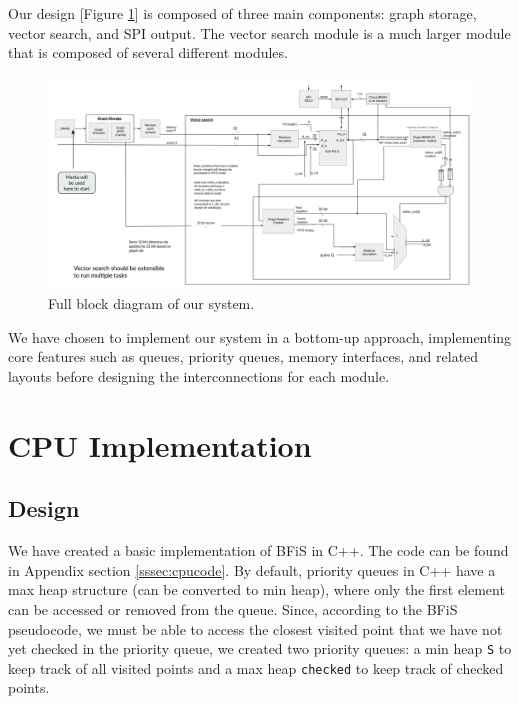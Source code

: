 \documentclass[conference]{IEEEtran}
\begin{document}
Our design [Figure \ref{fig:blockdiagram}] is composed of three main components: graph storage, vector search, and SPI output. The vector search module is a much larger module that is composed of several different modules.

\begin{figure}[htbp]
\begin{strip} %
\centerline{\includegraphics[width=\linewidth]{block.png}}
\caption{Full block diagram of our system.}
\label{fig:blockdiagram}
\end{strip}
    
\end{figure}

We have chosen to implement our system in a bottom-up approach, implementing core features such as queues, priority queues, memory interfaces, and related layouts before designing the interconnections for each module.

\section{CPU Implementation}

\subsection{Design}

We have created a basic implementation of BFiS in C++. The code can be found in Appendix section \ref{sssec:cpucode}.
By default, priority queues in C++ have a max heap structure (can be converted to min heap), where only the first element can be accessed or removed from the queue. Since, according to the BFiS pseudocode, we must be able to access the closest visited point  that we have not yet checked in the priority queue, we created two priority queues: a min heap \texttt{S} to keep track of all visited points and a max heap \texttt{checked} to keep track of checked points. 
\end{document}
